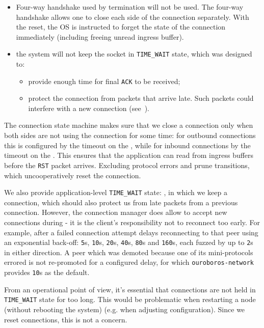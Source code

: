 \begin{itemize}
  \item Four-way handshake used by \TCP{} termination will not be used. The
    four-way handshake allows one to close each side of the connection separately.
    With the reset, the OS is instructed to forget the state of the connection
    immediately (including freeing unread ingress buffer).
  \item the system will not keep the socket in \texttt{TIME\_WAIT} state, which
    was designed to:
    \begin{itemize}
      \item provide enough time for final \texttt{ACK} to be received;
      \item protect the connection from packets that arrive late. Such
        packets could interfere with a new connection
        (see~\cite{stevens2003unix}).
    \end{itemize}
\end{itemize}

The connection state machine makes sure that we close a connection only when
both sides are not using the connection for some time: for outbound connections
this is configured by the timeout on the \OutboundIdleStateAny{}, while for
inbound connections by the timeout on the \InboundIdleStateAny{}.
This ensures that the application can read from ingress buffers
before the \texttt{RST} packet arrives.  Excluding protocol errors and prune
transitions, which uncooperatively reset the connection.

We also provide application-level \texttt{TIME\_WAIT} state:
\TerminatingState{}, in which we keep a connection, which should also protect us
from late packets from a previous connection. However, the connection manager
does allow to accept new connections during \TerminatingState{} - it is
the client's responsibility not to reconnect too early. For example, after
a failed connection attempt \ptopgov{} delays reconnecting to that peer using
an exponential back-off: \texttt{5}s, \texttt{10}s, \texttt{20}s, \texttt{40}s,
\texttt{80}s and \texttt{160}s, each fuzzed by up to \texttt{2}s in either
direction.  A peer which was demoted because one of its mini-protocols errored
is not re-promoted for a configured delay, for which
\texttt{ouroboros-network} provides \texttt{10}s as the default.

From an operational point of view, it's essential that connections are not held in
\texttt{TIME\_WAIT} state for too long. This would be problematic when
restarting a node (without rebooting the system) (e.g. when adjusting
configuration). Since we reset connections, this is not a concern.


